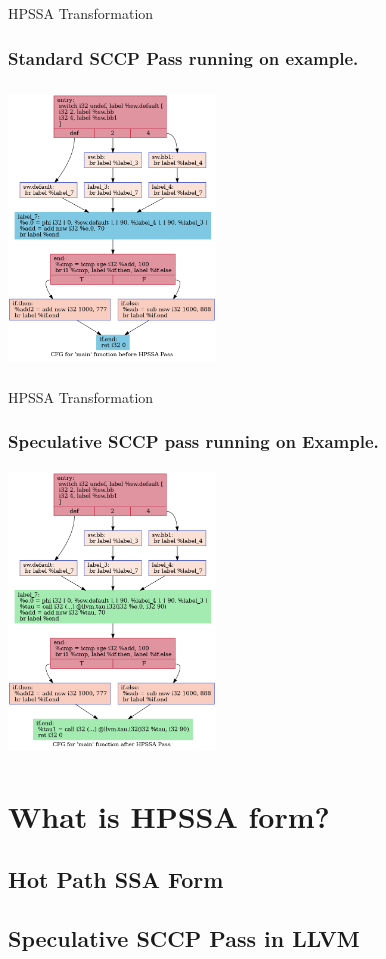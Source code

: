 \documentclass[aspectratio=169]{beamer}
\begin{document}
\begin{frame}{HPSSA Transformation}
	\frametitle{Standard SCCP Pass running on example.}
	\centering
	\includegraphics[width=5.5cm,height=7.5cm]{baseline.dot.png}
\end{frame}

\begin{frame}{HPSSA Transformation}
	\frametitle{Speculative SCCP pass running on Example.}
	\centering
	\includegraphics[width=5.5cm,height=7.5cm]{afterHPSSA.dot.png}
\end{frame}

\section{What is HPSSA form?}
\subsection{Hot Path SSA Form}
{
	
}
\subsection{Speculative SCCP Pass in LLVM}
{
	
}
\end{document}
